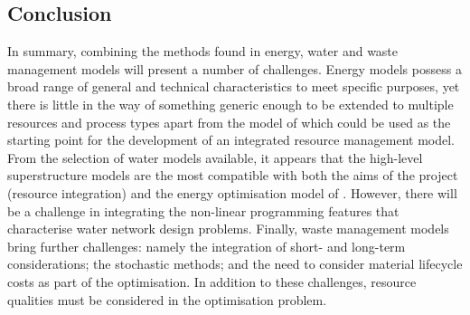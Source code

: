 \subsection{Conclusion}
In summary, combining the methods found in energy, water and waste management models will present a number of challenges. Energy models possess a broad range of general and technical characteristics to meet specific purposes, yet there is little in the way of something generic enough to be extended to multiple resources and process types apart from the model of \citet{Samsatli} which could be used as the starting point for the development of an integrated resource management model. From the selection of water models available, it appears that the high-level superstructure models are the most compatible with both the aims of the project (resource integration) and the energy optimisation model of \citet{Samsatli}. However, there will be a challenge in integrating the non-linear programming features that characterise water network design problems. Finally, waste management models bring further challenges: namely the integration of short- and long-term considerations; the stochastic methods; and the need to consider material lifecycle costs as part of the optimisation. In addition to these challenges, resource qualities must be considered in the optimisation problem.


